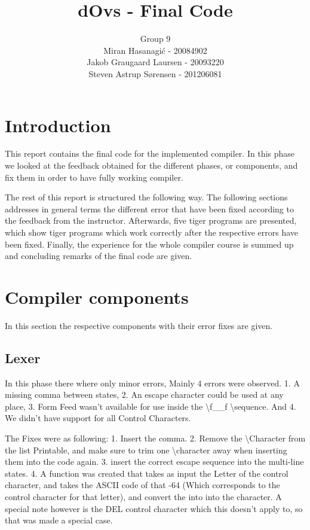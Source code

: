 \documentclass{article}
\title{dOvs - Final Code}
\author{
  Group 9 \\
  Miran Hasanagi\'{c} - 20084902 \\
  Jakob Graugaard Laursen - 20093220\\
  Steven Astrup S\o rensen - 201206081
}
\begin{document}
\maketitle

\section{Introduction}
This report contains the final code for the implemented compiler. In this phase we looked at the feedback obtained for the different phases, or components, and fix them in order to have fully working compiler. 

The rest of this report is structured the following way. The following sections addresses in general terms the different error that have been fixed according to the feedback from the instructor. Afterwards, five tiger programs are presented, which show tiger programs which work correctly after the respective errors have been fixed. Finally, the experience for the whole compiler course is summed up and concluding remarks of the final code are given.


\section{Compiler components}
In this section the respective components with their error fixes are given. 

\subsection{Lexer}
In this phase there where only minor errors, Mainly 4 errors were observed. 1. A missing comma between states, 2. An escape character could be used at any place, 3. Form Feed wasn't available for use inside the \textbackslash f\_\_f \textbackslash sequence. And 4. We didn't have support for all Control Characters.

The Fixes were as following: 1. Insert the comma. 2. Remove the \textbackslash Character from the list {Printable}, and make sure to trim one \textbackslash character away when inserting them into the code again. 3. insert the correct escape sequence into the multi-line states. 4. A function was created that takes as input the Letter of the control character, and takes the ASCII code of that -64 (Which corresponds to the control character for that letter), and convert the into into the character. A special note however is the DEL control character which this doesn't apply to, so that was made a special case.
\end{document}
